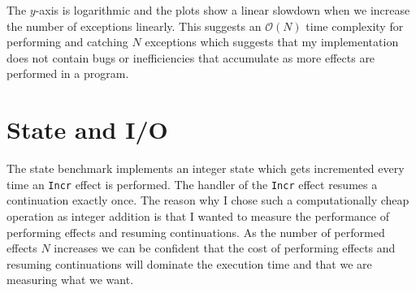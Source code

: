\documentclass[class=article, crop=false]{standalone}
\begin{document}
The $y$-axis is logarithmic and the plots show a linear slowdown when we
increase the number of exceptions linearly. This suggests an $\mathcal{O}(N)$
time complexity for performing and catching $N$ exceptions which suggests that
my implementation does not contain bugs or inefficiencies that accumulate
as more effects are performed in a program.

\section{State and I/O}

The state benchmark implements an integer state which gets incremented every
time an \verb|Incr| effect is performed. The handler of the \verb|Incr| effect
resumes a continuation exactly once. The reason why I chose such a 
computationally cheap operation as integer addition is that I wanted to measure
the performance of performing effects and resuming continuations. As the number
of performed effects $N$ increases we can be confident that the cost of
performing effects and resuming continuations will dominate the execution time
and that we are measuring what we want.
\end{document}
